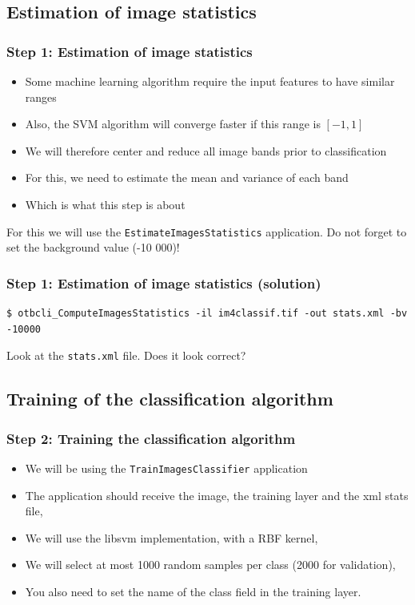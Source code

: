 \documentclass[8pt]{beamer}
\begin{document}
\subsection{Estimation of image statistics}

\begin{frame}
\frametitle{Step 1: Estimation of image statistics}

\begin{itemize}
\item Some machine learning algorithm require the input features to have similar ranges
\item Also, the SVM algorithm will converge faster if this range is $[-1,1]$
\item We will therefore center and reduce all image bands prior to classification
\item For this, we need to estimate the mean and variance of each band
\item Which is what this step is about
\end{itemize}

For this we will use the \texttt{EstimateImagesStatistics} application. Do not forget to set the background value (-10 000)!

\end{frame}

\begin{frame}[fragile]
\frametitle{Step 1: Estimation of image statistics (solution)}

\begin{scriptsize}
\begin{verbatim}
$ otbcli_ComputeImagesStatistics -il im4classif.tif -out stats.xml -bv -10000
\end{verbatim}
\end{scriptsize}

Look  at the \texttt{stats.xml} file. Does it look correct?

\end{frame}

\subsection{Training of the classification algorithm}

\begin{frame}
\frametitle{Step 2: Training the classification algorithm}

\begin{itemize}
\item We will be using the \texttt{TrainImagesClassifier} application
\item The application should receive the image, the training layer and the xml stats file,
\item We will use the libsvm implementation, with a RBF kernel,
\item We will select at most 1000 random samples per class (2000 for validation),
\item You also need to set the name of the class field in the training layer.
\end{itemize}


\end{frame}
\end{document}
